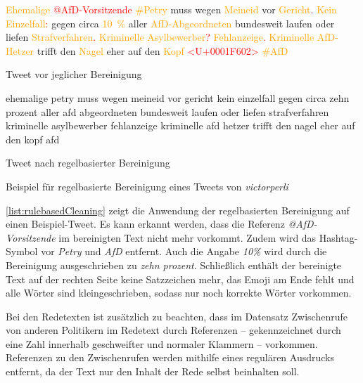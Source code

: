 \begin{example}[H]
    {\footnotesize
    \begin{subexample}{0.45\textwidth}
        \textcolor{orange}{Ehemalige} \textcolor{red}{@AfD-Vorsitzende} \textcolor{orange}{\#Petry} muss wegen \textcolor{orange}{Meineid} vor \textcolor{orange}{Gericht}\textcolor{red}{.} \textcolor{orange}{Kein Einzelfall}\textcolor{red}{:} gegen circa \textcolor{orange}{\SI{10}{\percent}} aller \textcolor{orange}{AfD-Abgeordneten} bundesweit laufen oder liefen \textcolor{orange}{Strafverfahren}\textcolor{red}{.} \textcolor{orange}{Kriminelle Asylbewerber}\textcolor{red}{?} \textcolor{orange}{Fehlanzeige}\textcolor{red}{.} \textcolor{orange}{Kriminelle AfD-Hetzer} trifft den \textcolor{orange}{Nagel} eher auf den \textcolor{orange}{Kopf} \textcolor{red}{<U+0001F602>} \textcolor{orange}{\#AfD}
        \caption{Tweet vor jeglicher Bereinigung \parencite{saltzer_finding_2022}}
    \end{subexample}\hfill
    \begin{subexample}{0.45\textwidth}
        ehemalige petry muss wegen meineid vor gericht kein einzelfall gegen circa zehn prozent aller afd abgeordneten bundesweit laufen oder liefen strafverfahren kriminelle asylbewerber fehlanzeige kriminelle afd hetzer trifft den nagel eher auf den kopf afd
        \caption{Tweet nach regelbasierter Bereinigung}
    \end{subexample}\hfill
    }
    \caption[Beispiel -- Regelbasierte Bereinigung]{Beispiel für regelbasierte Bereinigung eines Tweets von \textit{victorperli} \autocite{saltzer_finding_2022}} \label{list:rulebasedCleaning}
\end{example}

\autoref{list:rulebasedCleaning} zeigt die Anwendung der regelbasierten Bereinigung auf einen Beispiel-Tweet. Es kann erkannt werden, dass die Referenz \textit{@AfD-Vorsitzende} im bereinigten Text nicht mehr vorkommt. Zudem wird das Hashtag-Symbol vor \textit{Petry} und \textit{AfD} entfernt. Auch die Angabe \textit{10\%} wird durch die Bereinigung ausgeschrieben zu \textit{zehn prozent}. Schließlich enthält der bereinigte Text auf der rechten Seite keine Satzzeichen mehr, das Emoji am Ende fehlt und alle Wörter sind kleingeschrieben, sodass nur noch korrekte Wörter vorkommen.

Bei den Redetexten ist zusätzlich zu beachten, dass im Datensatz Zwischenrufe von anderen Politikern im Redetext durch Referenzen -- gekennzeichnet durch eine Zahl innerhalb geschweifter und normaler Klammern -- vorkommen. Referenzen zu den Zwischenrufen werden mithilfe eines regulären Ausdrucks entfernt, da der Text nur den Inhalt der Rede selbst beinhalten soll.

